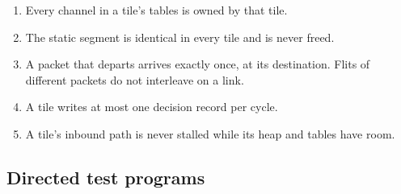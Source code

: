 \documentclass[11pt]{article}
\theoremstyle{definition}
\theoremstyle{remark}
\begin{document}
\begin{enumerate}[label=I\arabic*.,start=10]
\item Every channel in a tile's tables is owned by that tile.
\item The static segment is identical in every tile and is never freed.
\item A packet that departs arrives exactly once, at its destination. Flits
of different packets do not interleave on a link.
\item A tile writes at most one decision record per cycle.
\item A tile's inbound path is never stalled while its heap and tables have
room.
\end{enumerate}

\subsection{Directed test programs}
\end{document}
